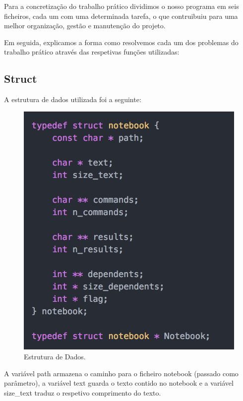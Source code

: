 \documentclass[a4paper]{article}
\begin{document}
Para a concretização do trabalho prático dividimos o nosso programa em
seis ficheiros, cada um com uma determinada tarefa,
o que contruibuiu para uma melhor organização,
gestão e manutenção do projeto.

Em seguida, explicamos a forma como resolvemos cada um dos problemas do
trabalho prático através das respetivas funções utilizadas:


\subsection{Struct}
\label{sec:struct}

A estrutura de dados utilizada foi a seguinte:

\begin{figure}[H]
\centering
\includegraphics[scale=0.35]{imgs/struct.png}
\caption{Estrutura de Dados.}
\label{img:datastruct}
\end{figure}

A variável \textsf{path} armazena o caminho para o ficheiro notebook (passado
como parâmetro), a variável \textsf{text} guarda o texto contido no notebook
e a variável \textsf{size\_text} traduz o respetivo comprimento do texto.
\end{document}

